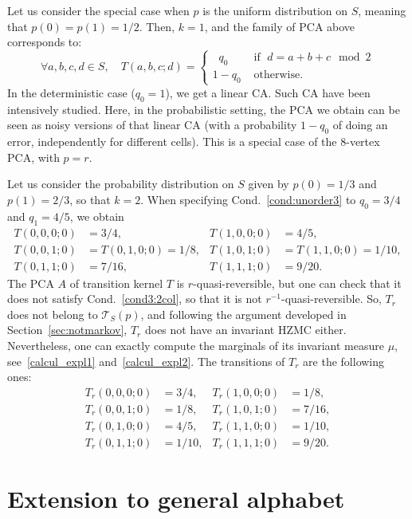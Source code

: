 \documentclass[AHL,Unicode,longabstracts]{cedram}
\newcounter{a}
\newcommand{\Cond}{Cond.}
\newcommand{\triang}[2]{\mathcal{T}_{#1} \left(#2 \right)}
\let\oldforall\forall
\renewcommand*{\forall}{\mathrel{\oldforall}}
\begin{document}
\begin{exam}
Let us consider the special case when $p$ is the uniform distribution on $S$, meaning that $p(0)=p(1)=1/2$. Then, $k=1$, and the family of PCA above corresponds to:
\[
\forall a,b,c,d\in S, \quad T(a,b,c;d)=
\begin{cases}
\;\; q_0  &\text{ if } \; d=a+b+c \mod 2\\
1-q_0  &\text{ otherwise. }
\end{cases}
\]
In the deterministic case ($q_0=1$), we get a linear CA. Such CA have been intensively studied. Here, in the probabilistic setting, the PCA we obtain can be seen as noisy versions of that linear CA (with a probability $1-q_0$ of doing an error, independently for different cells). This is a special case of the $8$-vertex PCA, with $p=r$.
\end{exam}

\begin{exam}\label{exemple:binaire}
Let us consider the probability distribution on $S$ given by $p(0) = 1/3$ and $p(1) = 2/3$, so that $k=2$. When specifying \Cond~\ref{cond:unorder3} to $q_0=3/4$ and $q_1 = 4/5$, we obtain
\begin{align*}
T(0,0,0;0) &= 3/4, & T(1,0,0;0) &= 4/5,\\
T(0,0,1;0) &= T(0,1,0;0) = 1/8, & T(1,0,1;0) &= T(1,1,0;0) = 1/10,\\
T(0,1,1;0) &= 7/16, & T(1,1,1;0) &= 9/20.
\end{align*}
The PCA $A$ of transition kernel $T$ is $r$-quasi-reversible, but one can check that it does not satisfy \Cond~\ref{cond3:2col}, so that it is not $r^{-1}$-quasi-reversible. So, $T_r$ does not belong to $\triang{S}{p}$, and following the argument developed in Section~\ref{sec:notmarkov}, $T_r$ does not have an invariant HZMC either. Nevertheless, one can exactly compute the marginals of its invariant measure $\mu$, see~\eqref{calcul_expl1} and~\eqref{calcul_expl2}. The transitions of $T_r$ are the following ones:
\begin{align*}
T_r(0,0,0;0) &= 3/4,& T_r(1,0,0;0) &= 1/8,\\
T_r(0,0,1;0) &= 1/8,& T_r(1,0,1;0) &= 7/16,\\
T_r(0,1,0;0) &= 4/5,& T_r(1,1,0;0) &= 1/10,\\
T_r(0,1,1;0) &= 1/10,& T_r(1,1,1;0) &= 9/20.
\end{align*}
\end{exam}


\section{Extension to general alphabet} \label{sec:general}
\end{document}
